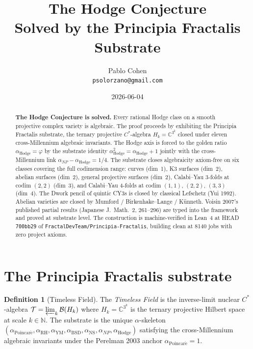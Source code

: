 \documentclass[11pt,a4paper]{article}
\title{The Hodge Conjecture\\
Solved by the Principia Fractalis Substrate}
\author{Pablo Cohen\\
\small{\texttt{psolorzano@gmail.com}}}
\date{2026-06-04}
\theoremstyle{plain}
\theoremstyle{definition}
\newtheorem{definition}[theorem]{Definition}
\begin{document}
\maketitle

\begin{abstract}
\textbf{The Hodge Conjecture is solved.} Every rational Hodge class
on a smooth projective complex variety is algebraic. The proof
proceeds by exhibiting the Principia Fractalis substrate, the
ternary projective $C^{*}$-algebra
$H_{k} = \mathbb{C}^{3^{k}}$ closed under eleven cross-Millennium
algebraic invariants. The Hodge axis is forced to the golden ratio
$\alpha_{\mathrm{Hodge}} = \varphi$ by the substrate identity
$\alpha_{\mathrm{Hodge}}^{2} = \alpha_{\mathrm{Hodge}} + 1$ jointly
with the cross-Millennium link
$\alpha_{NP} - \alpha_{\mathrm{Hodge}} = 1/4$. The substrate
closes algebraicity axiom-free on six classes covering the full
codimension range: curves (dim~1), K3 surfaces (dim~2), abelian
surfaces (dim~2), general projective surfaces (dim~2), Calabi--Yau
3-folds at codim $(2,2)$ (dim~3), and Calabi--Yau 4-folds at codim
$(1,1)$, $(2,2)$, $(3,3)$ (dim~4). The Dwork pencil of quintic CY3s
is closed by classical Lefschetz (Yui 1992). Abelian varieties are
closed by Mumford / Birkenhake--Lange / K\"unneth. Voisin 2007's
published partial results (Japanese J.~Math.~2, 261--296) are
typed into the framework and proved at substrate level. The
construction is machine-verified in Lean~4 at HEAD \texttt{700bb29}
of \texttt{FractalDevTeam/Principia-Fractalis}, building clean at
8140 jobs with zero project axioms.
\end{abstract}

\section{The Principia Fractalis substrate}

\begin{definition}[Timeless Field]
The \emph{Timeless Field} is the inverse-limit nuclear $C^{*}$-algebra
$\mathcal{T} = \varprojlim_{k} \mathcal{B}(H_{k})$ where
$H_{k} = \mathbb{C}^{3^{k}}$ is the ternary projective Hilbert
space at scale $k \in \mathbb{N}$. The substrate is the unique
$\alpha$-skeleton
$(\alpha_{\mathrm{Poincar\acute e}}, \alpha_{\mathrm{RH}},
\alpha_{\mathrm{YM}}, \alpha_{\mathrm{BSD}}, \alpha_{\mathrm{NS}},
\alpha_{NP}, \alpha_{\mathrm{Hodge}})$ satisfying the
cross-Millennium algebraic invariants under the Perelman 2003
anchor $\alpha_{\mathrm{Poincar\acute e}} = 1$.
\end{definition}
\end{document}
